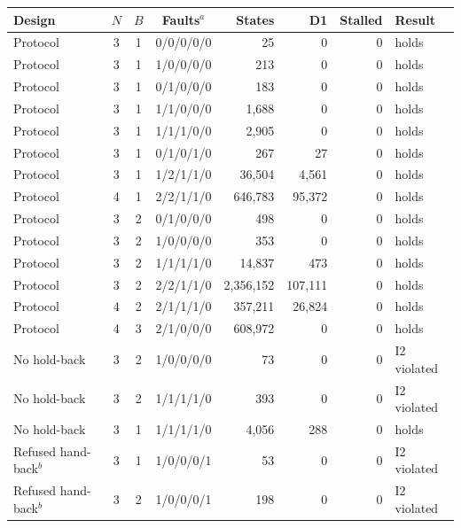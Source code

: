 
\begin{tabular}{@{}lcccrrrl@{}}
\toprule
Design & $N$ & $B$ & Faults$^a$ & States & D1 & Stalled & Result \\
\midrule
Protocol & 3 & 1 & 0/0/0/0/0 & 25 & 0 & 0 & holds \\
Protocol & 3 & 1 & 1/0/0/0/0 & 213 & 0 & 0 & holds \\
Protocol & 3 & 1 & 0/1/0/0/0 & 183 & 0 & 0 & holds \\
Protocol & 3 & 1 & 1/1/0/0/0 & 1,688 & 0 & 0 & holds \\
Protocol & 3 & 1 & 1/1/1/0/0 & 2,905 & 0 & 0 & holds \\
Protocol & 3 & 1 & 0/1/0/1/0 & 267 & 27 & 0 & holds \\
Protocol & 3 & 1 & 1/2/1/1/0 & 36,504 & 4,561 & 0 & holds \\
Protocol & 4 & 1 & 2/2/1/1/0 & 646,783 & 95,372 & 0 & holds \\
Protocol & 3 & 2 & 0/1/0/0/0 & 498 & 0 & 0 & holds \\
Protocol & 3 & 2 & 1/0/0/0/0 & 353 & 0 & 0 & holds \\
Protocol & 3 & 2 & 1/1/1/1/0 & 14,837 & 473 & 0 & holds \\
Protocol & 3 & 2 & 2/2/1/1/0 & 2,356,152 & 107,111 & 0 & holds \\
Protocol & 4 & 2 & 2/1/1/1/0 & 357,211 & 26,824 & 0 & holds \\
Protocol & 4 & 3 & 2/1/0/0/0 & 608,972 & 0 & 0 & holds \\
No hold-back & 3 & 2 & 1/0/0/0/0 & 73 & 0 & 0 & I2 violated \\
No hold-back & 3 & 2 & 1/1/1/1/0 & 393 & 0 & 0 & I2 violated \\
No hold-back & 3 & 1 & 1/1/1/1/0 & 4,056 & 288 & 0 & holds \\
Refused hand-back$^b$ & 3 & 1 & 1/0/0/0/1 & 53 & 0 & 0 & I2 violated \\
Refused hand-back$^b$ & 3 & 2 & 1/0/0/0/1 & 198 & 0 & 0 & I2 violated \\
\bottomrule
\end{tabular}
